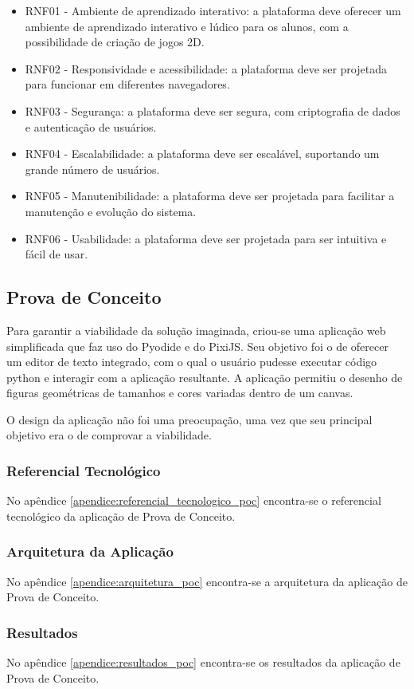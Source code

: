\begin{itemize}
    \item RNF01 - Ambiente de aprendizado interativo: a plataforma deve oferecer um ambiente de aprendizado interativo e lúdico para os alunos, com a possibilidade de criação de jogos 2D.
    \item RNF02 - Responsividade e acessibilidade: a plataforma deve ser projetada para funcionar em diferentes navegadores.
    \item RNF03 - Segurança: a plataforma deve ser segura, com criptografia de dados e autenticação de usuários.
    \item RNF04 - Escalabilidade: a plataforma deve ser escalável, suportando um grande número de usuários.
    \item RNF05 - Manutenibilidade: a plataforma deve ser projetada para facilitar a manutenção e evolução do sistema.
    \item RNF06 - Usabilidade: a plataforma deve ser projetada para ser intuitiva e fácil de usar.
\end{itemize}

\subsection{Prova de Conceito}

Para garantir a viabilidade da solução imaginada, criou-se uma aplicação web simplificada que faz uso do Pyodide e do PixiJS. Seu objetivo foi o de oferecer um editor de texto integrado, com o qual o usuário pudesse executar código python e interagir com a aplicação resultante. A aplicação permitiu o desenho de figuras geométricas de tamanhos e cores variadas dentro de um canvas.

O design da aplicação não foi uma preocupação, uma vez que seu principal objetivo era o de comprovar a viabilidade.

\subsubsection{Referencial Tecnológico}

No apêndice \ref{apendice:referencial_tecnologico_poc} encontra-se o referencial tecnológico da aplicação de Prova de Conceito.

\subsubsection{Arquitetura da Aplicação}

No apêndice \ref{apendice:arquitetura_poc} encontra-se a arquitetura da aplicação de Prova de Conceito.

\subsubsection{Resultados}

No apêndice \ref{apendice:resultados_poc} encontra-se os resultados da aplicação de Prova de Conceito.

